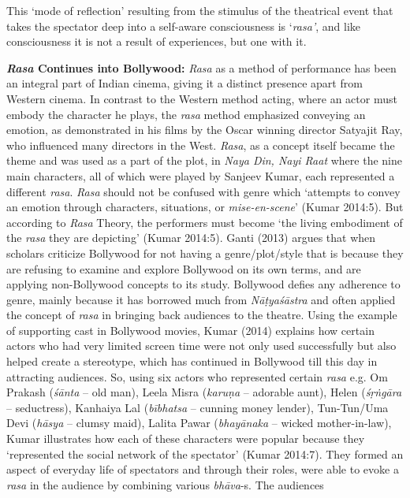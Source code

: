 This ‘mode of reflection’ resulting from the stimulus of the theatrical event that takes the spectator deep into a self-aware consciousness is ‘\textsl{rasa’}, and like consciousness it is not a result of experiences, but one with it.

\textbf{\textsl{Rasa} Continues into Bollywood:} \textsl{Rasa} as a method of performance has been an integral part of Indian cinema, giving it a distinct presence apart from Western cinema. In contrast to the Western method acting, where an actor must embody the character he plays, the \textsl{rasa} method emphasized conveying an emotion, as demonstrated in his films by the Oscar winning director Satyajit Ray, who influenced many directors in the West. \textsl{Rasa}, as a concept itself became the theme and was used as a part of the plot, in \textsl{Naya Din, Nayi Raat} where the nine main characters, all of which were played by Sanjeev Kumar, each represented a different \textsl{rasa}. \textsl{Rasa} should not be confused with genre which ‘attempts to convey an emotion through characters, situations, or \textsl{mise-en-scene}’ (Kumar 2014:5). But according to \textsl{Rasa} Theory, the performers must become ‘the living embodiment of the \textsl{rasa} they are depicting’ (Kumar 2014:5). Ganti (2013) argues that when scholars criticize Bollywood for not having a genre/plot/style that is because they are refusing to examine and explore Bollywood on its own terms, and are applying non-Bollywood concepts to its study. Bollywood defies any adherence to genre, mainly because it has borrowed much from \textsl{Nāṭyaśāstra} and often applied the concept of \textsl{rasa} in bringing back audiences to the theatre. Using the example of supporting cast in Bollywood movies, Kumar (2014) explains how certain actors who had very limited screen time were not only used successfully but also helped create a stereotype, which has continued in Bollywood till this day in attracting audiences. So, using six actors who represented certain \textsl{rasa} e.g. Om Prakash (\textsl{śānta} -- old man), Leela Misra (\textsl{karuṇa} -- adorable aunt), Helen (\textsl{śṛṅgāra} -- seductress), Kanhaiya Lal (\textsl{bībhatsa} -- cunning money lender), Tun-Tun/Uma Devi (\textsl{hāsya} -- clumsy maid), Lalita Pawar (\textsl{bhayānaka} -- wicked mother-in-law), Kumar illustrates how each of these characters were popular because they ‘represented the social network of the spectator’ (Kumar 2014:7). They formed an aspect of everyday life of spectators and through their roles, were able to evoke a \textsl{rasa} in the audience by combining various \textsl{bhāva}-s. The audiences 